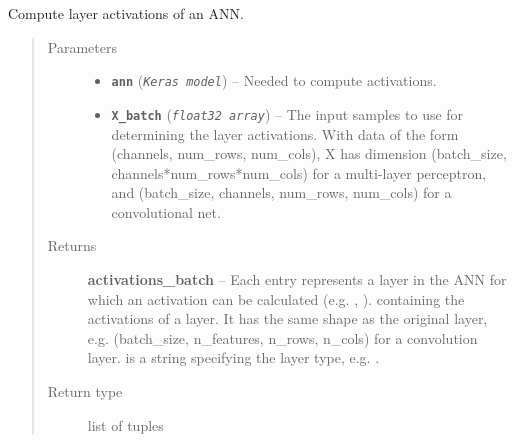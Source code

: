 \documentclass[letterpaper,10pt,english]{sphinxmanual}
\begin{document}
\begin{fulllineitems}
\label{core:core.util.get_activations_batch}
Compute layer activations of an ANN.
\begin{quote}\begin{description}
\item[{Parameters}] \leavevmode\begin{itemize}
\item {} 
\textbf{\texttt{ann}} (\emph{\texttt{Keras model}}) -- Needed to compute activations.

\item {} 
\textbf{\texttt{X\_batch}} (\emph{\texttt{float32 array}}) -- The input samples to use for determining the layer activations. With
data of the form (channels, num\_rows, num\_cols), X has dimension
(batch\_size, channels*num\_rows*num\_cols) for a multi-layer perceptron,
and (batch\_size, channels, num\_rows, num\_cols) for a convolutional net.

\end{itemize}

\item[{Returns}] \leavevmode
\textbf{activations\_batch} -- Each entry represents a layer in the ANN for which an activation can be
calculated (e.g. , ).
 containing the activations of a layer. It has the same
shape as the original layer, e.g.
(batch\_size, n\_features, n\_rows, n\_cols) for a convolution layer.
 is a string specifying the layer type, e.g. .

\item[{Return type}] \leavevmode
list of tuples 

\end{description}\end{quote}

\end{fulllineitems}

\end{document}
